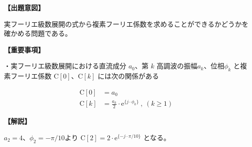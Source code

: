 \noindent \textbf{【出題意図】}

\bigskip
\noindent 実フーリエ級数展開の式から複素フーリエ係数を求めることができるかどうかを確かめる問題である。

\vspace{1em}
\noindent \textbf{【重要事項】}

\medskip
\noindent・実フーリエ級数展開における直流成分 $a_0$、第 $k$ 高調波の振幅$a_k$、位相$\phi_k$ と複素フーリエ係数 $\textrm{C}[0]$、$\textrm{C}[k]$ には次の関係がある

\begin{align*}
\textrm{C}[0] &= a_0 \\
\textrm{C}[k] &= \frac{a_k}{2} \cdot \textrm{e}^{\{j \cdot \phi_k \}} \ ,\ (k\geq 1)
\end{align*}


\bigskip

\vspace{1em}
\noindent \textbf{【解説】}

\bigskip
\noindent $a_2 = 4$、$\phi_2=-\pi/10$より $\textrm{C}[2] = 2 \cdot \textrm{e}^{\{-j \cdot \pi/10 \}}$ となる。
